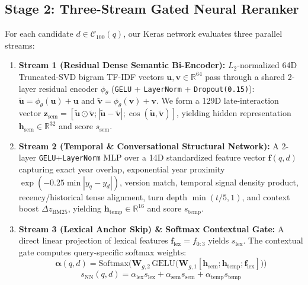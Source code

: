 \documentclass[10pt,twocolumn]{article}
\begin{document}
\subsection{Stage 2: Three-Stream Gated Neural Reranker}
For each candidate $d \in \mathcal{C}_{100}(q)$, our Keras network evaluates three parallel streams:
\begin{enumerate}
    \item \textbf{Stream 1 (Residual Dense Semantic Bi-Encoder):} $L_2$-normalized 64D Truncated-SVD bigram TF-IDF vectors $\mathbf{u}, \mathbf{v} \in \mathbb{R}^{64}$ pass through a shared 2-layer residual encoder $\phi_\theta$ (\texttt{GELU} + \texttt{LayerNorm} + \texttt{Dropout(0.15)}): $\tilde{\mathbf{u}} = \phi_\theta(\mathbf{u}) + \mathbf{u}$ and $\tilde{\mathbf{v}} = \phi_\theta(\mathbf{v}) + \mathbf{v}$. We form a 129D late-interaction vector $\mathbf{z}_{\text{sem}} = [\tilde{\mathbf{u}} \odot \tilde{\mathbf{v}}; |\tilde{\mathbf{u}} - \tilde{\mathbf{v}}|; \cos(\tilde{\mathbf{u}}, \tilde{\mathbf{v}})]$, yielding hidden representation $\mathbf{h}_{\text{sem}} \in \mathbb{R}^{32}$ and score $s_{\text{sem}}$.
    \item \textbf{Stream 2 (Temporal \& Conversational Structural Network):} A 2-layer \texttt{GELU}+\texttt{LayerNorm} MLP over a 14D standardized feature vector $\mathbf{f}(q,d)$ capturing exact year overlap, exponential year proximity $\exp(-0.25 \min |y_q - y_d|)$, version match, temporal signal density product, recency/historical tense alignment, turn depth $\min(t/5, 1)$, and context boost $\Delta z_{\text{BM25}}$, yielding $\mathbf{h}_{\text{temp}} \in \mathbb{R}^{16}$ and score $s_{\text{temp}}$.
    \item \textbf{Stream 3 (Lexical Anchor Skip) \& Softmax Contextual Gate:} A direct linear projection of lexical features $\mathbf{f}_{\text{lex}} = f_{0:3}$ yields $s_{\text{lex}}$. The contextual gate computes query-specific softmax weights:
    \begin{equation}
    \boldsymbol{\alpha}(q, d) = \text{Softmax}\Big(\mathbf{W}_{g,2}\,\text{GELU}\big(\mathbf{W}_{g,1}[\mathbf{h}_{\text{sem}}; \mathbf{h}_{\text{temp}}; \mathbf{f}_{\text{lex}}]\big)\Big)
    \end{equation}
    \begin{equation}
    s_{\text{NN}}(q, d) = \alpha_{\text{lex}} s_{\text{lex}} + \alpha_{\text{sem}} s_{\text{sem}} + \alpha_{\text{temp}} s_{\text{temp}}
    \end{equation}
\end{enumerate}
\end{document}
